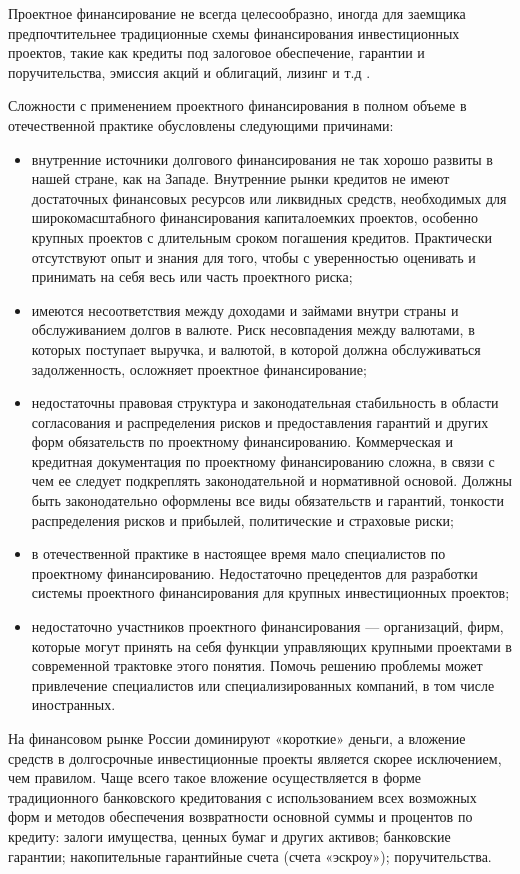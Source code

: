 Проектное финансирование не всегда целесообразно, иногда для заемщика предпочтительнее традиционные схемы финансирования инвестиционных проектов, такие как кредиты под залоговое обеспечение, гарантии и поручительства, эмиссия акций и облигаций, лизинг и т.д \cite[299--303]{mazur}.

Сложности с применением проектного финансирования в полном объеме в отечественной практике обусловлены следующими причинами:
\begin{itemize}
	\item внутренние источники долгового финансирования не так хорошо развиты в нашей стране, как на Западе. Внутренние рынки кредитов не имеют достаточных финансовых ресурсов или ликвидных средств, необходимых для широкомасштабного финансирования капиталоемких проектов, особенно крупных проектов с длительным сроком погашения кредитов. Практически отсутствуют опыт и знания для того, чтобы с уверенностью оценивать и принимать на себя весь или часть проектного риска;
	\item имеются несоответствия между доходами и займами внутри страны и обслуживанием долгов в валюте. Риск несовпадения между валютами, в которых поступает выручка, и валютой, в которой должна обслуживаться задолженность, осложняет проектное финансирование;
	\item недостаточны правовая структура и законодательная стабильность в области согласования и распределения рисков и предоставления гарантий и других форм обязательств по проектному финансированию. Коммерческая и кредитная документация по проектному финансированию сложна, в связи с чем ее следует подкреплять законодательной и нормативной основой. Должны быть законодательно оформлены все виды обязательств и гарантий, тонкости распределения рисков и прибылей, политические и страховые риски;
	\item в отечественной практике в настоящее время мало специалистов по проектному финансированию. Недостаточно прецедентов для разработки системы проектного финансирования для крупных инвестиционных проектов;
	\item недостаточно участников проектного финансирования --- организаций, фирм, которые могут принять на себя функции управляющих крупными проектами в современной трактовке этого понятия. Помочь решению проблемы может привлечение специалистов или специализированных компаний, в том числе иностранных.
\end{itemize}

На финансовом рынке России доминируют «короткие» деньги, а вложение средств в долгосрочные инвестиционные проекты является скорее исключением, чем правилом.
Чаще всего такое вложение осуществляется в форме традиционного банковского кредитования с использованием всех возможных форм и методов обеспечения возвратности основной суммы и процентов по кредиту: залоги имущества, ценных бумаг и других активов; банковские гарантии; накопительные гарантийные счета (счета «эскроу»); поручительства.

